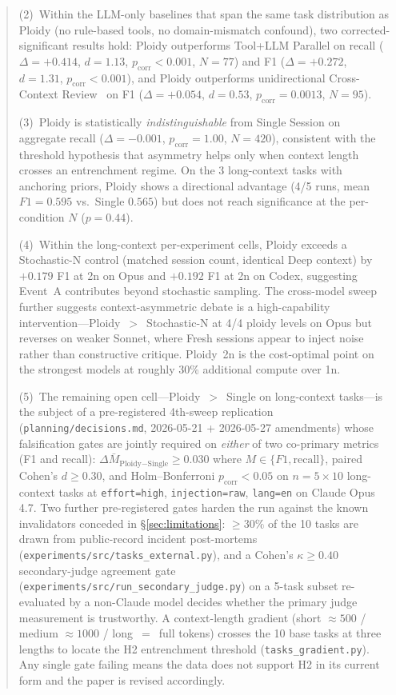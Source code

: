 \documentclass[11pt]{article}
\begin{document}
\begin{abstract}
\noindent (2)~Within the LLM-only baselines that span the same task distribution as Ploidy (no rule-based tools, no domain-mismatch confound), two corrected-significant results hold: Ploidy outperforms Tool+LLM Parallel on recall ($\Delta = +0.414$, $d = 1.13$, $p_\text{corr} < 0.001$, $N = 77$) and F1 ($\Delta = +0.272$, $d = 1.31$, $p_\text{corr} < 0.001$), and Ploidy outperforms unidirectional Cross-Context Review~\citep{song2026ccr} on F1 ($\Delta = +0.054$, $d = 0.53$, $p_\text{corr} = 0.0013$, $N = 95$).

\noindent (3)~Ploidy is statistically \emph{indistinguishable} from Single Session on aggregate recall ($\Delta = -0.001$, $p_\text{corr} = 1.00$, $N = 420$), consistent with the threshold hypothesis that asymmetry helps only when context length crosses an entrenchment regime. On the 3 long-context tasks with anchoring priors, Ploidy shows a directional advantage (4/5 runs, mean $F1 = 0.595$ vs.\ Single $0.565$) but does not reach significance at the per-condition $N$ ($p = 0.44$).

\noindent (4)~Within the long-context per-experiment cells, Ploidy exceeds a Stochastic-N control (matched session count, identical Deep context) by $+0.179$ F1 at 2n on Opus and $+0.192$ F1 at 2n on Codex, suggesting Event~A contributes beyond stochastic sampling. The cross-model sweep further suggests context-asymmetric debate is a high-capability intervention---Ploidy~$>$~Stochastic-N at 4/4 ploidy levels on Opus but reverses on weaker Sonnet, where Fresh sessions appear to inject noise rather than constructive critique. Ploidy~2n is the cost-optimal point on the strongest models at roughly 30\% additional compute over 1n.

\noindent (5)~The remaining open cell---Ploidy~$>$~Single on long-context tasks---is the subject of a pre-registered 4th-sweep replication (\texttt{planning/decisions.md}, 2026-05-21 + 2026-05-27 amendments) whose falsification gates are jointly required on \emph{either} of two co-primary metrics (F1 and recall): $\Delta \bar{M}_{\text{Ploidy}-\text{Single}} \geq 0.030$ where $M \in \{F1, \text{recall}\}$, paired Cohen's $d \geq 0.30$, and Holm--Bonferroni $p_\text{corr} < 0.05$ on $n{=}5 \times 10$ long-context tasks at \texttt{effort=high}, \texttt{injection=raw}, \texttt{lang=en} on Claude Opus 4.7. Two further pre-registered gates harden the run against the known invalidators conceded in \S\ref{sec:limitations}: $\geq 30\%$ of the 10 tasks are drawn from public-record incident post-mortems (\texttt{experiments/src/tasks\_external.py}), and a Cohen's $\kappa \geq 0.40$ secondary-judge agreement gate (\texttt{experiments/src/run\_secondary\_judge.py}) on a 5-task subset re-evaluated by a non-Claude model decides whether the primary judge measurement is trustworthy. A context-length gradient (short $\approx 500$ / medium $\approx 1000$ / long~$=$~full tokens) crosses the 10 base tasks at three lengths to locate the H2 entrenchment threshold (\texttt{tasks\_gradient.py}). Any single gate failing means the data does not support H2 in its current form and the paper is revised accordingly.


\end{abstract}
\end{document}
